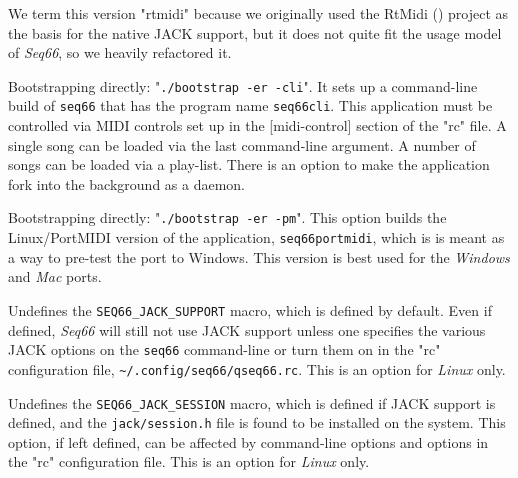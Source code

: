         We term this version "rtmidi" because we originally
        used the RtMidi (\cite{rtmidi}) project as the basis for the native
        JACK support, but it does not quite fit the usage model
        of \textsl{Seq66}, so we heavily refactored it.

        Bootstrapping directly:
        "\texttt{./bootstrap -er -cli}".
        It sets up a command-line build of \texttt{seq66} that has the
        program name \texttt{seq66cli}.
        This application must be controlled via MIDI controls set up in the
        [midi-control] section of the "rc" file.
        A single song can be loaded via the last command-line argument.
        A number of songs can be loaded via a play-list.
        There is an option to make
        the application fork into the background as a daemon.
%

        Bootstrapping directly:
        "\texttt{./bootstrap -er -pm}".
        This option builds the Linux/PortMIDI version of the application,
        \texttt{seq66portmidi},
        which is is meant as a way to pre-test the
        port to Windows.
        This version is best used for the \textsl{Windows} and
        \textsl{Mac} ports.


        Undefines the \texttt{SEQ66\_JACK\_SUPPORT} macro, which is
        defined by default.  Even if defined,
        \textsl{Seq66} will still not use JACK support unless
        one specifies the various JACK options on the \texttt{seq66}
        command-line or turn them on in the "rc" configuration file,
        \texttt{\textasciitilde/.config/seq66/qseq66.rc}.
        This is an option for \textsl{Linux} only.

        Undefines the \texttt{SEQ66\_JACK\_SESSION} macro, which is
        defined if JACK support is defined, and the
        \texttt{jack/session.h} file is found to be installed on the system.
        This option, if left defined, can be affected by
        command-line options and options in the "rc" configuration file.
        This is an option for \textsl{Linux} only.

